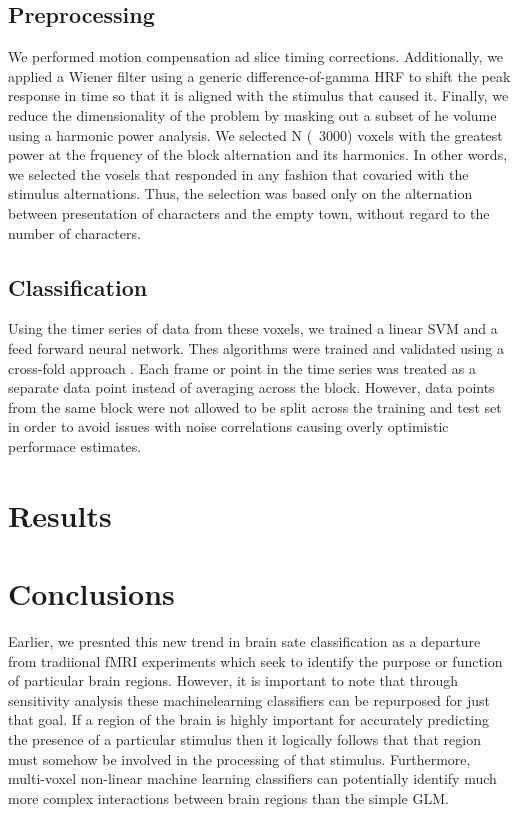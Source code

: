 \documentclass[draft]{article}
\begin{document}
\subsection{Preprocessing}
We performed motion compensation ad slice timing corrections. 
Additionally, we applied a Wiener filter using a generic difference-of-gamma HRF \cite{glover-ref} to shift the peak response in time so that it is aligned with the stimulus that caused it.
Finally, we reduce the dimensionality of the problem by masking out a subset of he volume using a harmonic power analysis.
We selected N (~3000) voxels with the greatest power at the frquency of the block alternation and its harmonics.
In other words, we selected the vosels that responded in any fashion that covaried with the stimulus alternations.
Thus, the selection was based only on the alternation between presentation of characters and the empty town, without regard to the number of characters.

\subsection{Classification}
Using the timer series of data from these voxels, we trained a linear SVM and a feed forward neural network.
Thes algorithms were trained and validated using a cross-fold approach \cite{crossfold}.
Each frame or point in the time series was treated as a separate data point instead of averaging across the block.
However, data points from the same block were not allowed to be split across the training and test set in order to avoid issues with noise correlations causing overly optimistic performace estimates.

\section{Results}

\section{Conclusions}

Earlier, we presnted this new trend in brain sate classification as a departure from tradiional fMRI experiments which seek to identify the purpose or function of particular brain regions.
However, it is important to note that through sensitivity analysis these machinelearning classifiers can be repurposed for just that goal.
If a region of the brain is highly important for accurately predicting the presence of a particular stimulus then it logically follows that that region must somehow be involved in the processing of that stimulus.
Furthermore, multi-voxel non-linear machine learning classifiers can potentially identify much more complex interactions between brain regions than the simple GLM.



\end{document}
